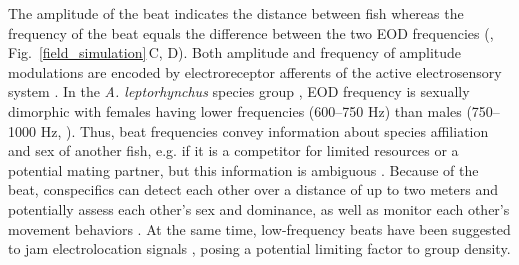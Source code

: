 \documentclass[11pt,pdftex]{article}
\newcommand{\panel}[1]{\textsf{#1}}
\newcommand{\subfref}[2]{\textup{\ref{#1}}\,\panel{#2}}
\newcommand{\figb}{Fig.}
\newcommand{\subfigrefb}[2]{\figb~\subfref{#1}{#2}}
\newcommand{\lepto}{\textit{A. leptorhynchus}}
\begin{document}
The amplitude of the beat indicates the distance between fish whereas the frequency of the beat equals the difference between the two EOD frequencies (\citealp{Henninger2020}, \subfigrefb{field_simulation}{C, D}). Both amplitude and frequency of amplitude modulations are encoded by electroreceptor afferents of the active electrosensory system \citep{Benda2006, Hupe2008b, Walz2014}. In the \lepto{} species group \citep{DeSantana2013}, EOD frequency is sexually dimorphic with females having lower frequencies (600--750 Hz) than males (750--1000 Hz, \citealp{Meyer1987}). Thus, beat frequencies convey information about species affiliation and sex of another fish, e.g. if it is a competitor for limited resources or a potential mating partner, but this information is ambiguous \citep{Henninger2018, Henninger2020}. Because of the beat, conspecifics can detect each other over a distance of up to two meters \citep{Knudsen1975, Henninger2018, Henninger2020} and potentially assess each other's sex and dominance, as well as monitor each other's movement behaviors \citep{Davies1978, Fernald2014}. At the same time, low-frequency beats have been suggested to jam electrolocation signals \citep{Bastian1987}, posing a potential limiting factor to group density.
\end{document}
